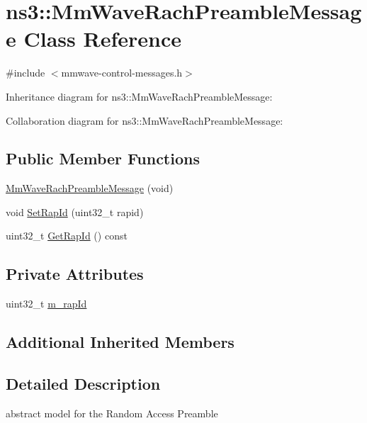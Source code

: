 \hypertarget{classns3_1_1MmWaveRachPreambleMessage}{}\section{ns3\+:\+:Mm\+Wave\+Rach\+Preamble\+Message Class Reference}
\label{classns3_1_1MmWaveRachPreambleMessage}


{\ttfamily \#include $<$mmwave-\/control-\/messages.\+h$>$}



Inheritance diagram for ns3\+:\+:Mm\+Wave\+Rach\+Preamble\+Message\+:


Collaboration diagram for ns3\+:\+:Mm\+Wave\+Rach\+Preamble\+Message\+:
\subsection*{Public Member Functions}
\begin{DoxyCompactItemize}
\item 
\hyperlink{classns3_1_1MmWaveRachPreambleMessage_a2cbc789a27303eca7352ca1f535be838}{Mm\+Wave\+Rach\+Preamble\+Message} (void)
\item 
void \hyperlink{classns3_1_1MmWaveRachPreambleMessage_a1836f3582e6bb452d3d6cd65f9e8b8c4}{Set\+Rap\+Id} (uint32\+\_\+t rapid)
\item 
uint32\+\_\+t \hyperlink{classns3_1_1MmWaveRachPreambleMessage_a12a5223096100e5c80385495430e8654}{Get\+Rap\+Id} () const 
\end{DoxyCompactItemize}
\subsection*{Private Attributes}
\begin{DoxyCompactItemize}
\item 
uint32\+\_\+t \hyperlink{classns3_1_1MmWaveRachPreambleMessage_ae2c2df027fd7c9db6dee89f0b4cb41b8}{m\+\_\+rap\+Id}
\end{DoxyCompactItemize}
\subsection*{Additional Inherited Members}


\subsection{Detailed Description}
abstract model for the Random Access Preamble 

